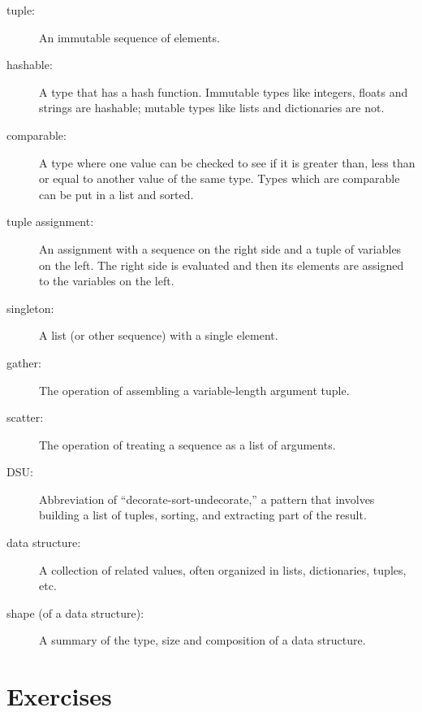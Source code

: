 \documentclass[10pt]{book}
\begin{document}
\begin{description}

\item[tuple:] An immutable sequence of elements.

\item[hashable:] A type that has a hash function.  Immutable
types like integers,
floats and strings are hashable; mutable types like lists and
dictionaries are not.

\item[comparable:] A type where one value can be checked to see if it is
greater than, less than or equal to another value of the same type.
Types which are comparable can be put in a list and sorted.

\item[tuple assignment:] An assignment with a sequence on the
right side and a tuple of variables on the left.  The right
side is evaluated and then its elements are assigned to the
variables on the left.

\item[singleton:] A list (or other sequence) with a single element.

\item[gather:] The operation of assembling a variable-length
argument tuple.

\item[scatter:] The operation of treating a sequence as a list of
arguments.


\item[DSU:] Abbreviation of ``decorate-sort-undecorate,'' a
pattern that involves building a list of tuples, sorting, and
extracting part of the result.

\item[data structure:] A collection of related values, often
organized in lists, dictionaries, tuples, etc.

\item[shape (of a data structure):] A summary of the type,
size and composition of a data structure.

\end{description}


\section{Exercises}
\end{document}
